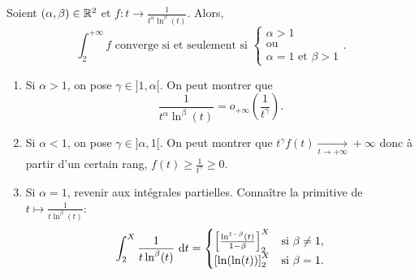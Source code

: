 \begin{tcolorbox}
    Soient $(\alpha, \beta) \in  \mathbb{R}^2$ et $f:t \to \frac{1}{t^{\alpha} \ln^{\beta} (t)}$. Alors,
    $$\int_{2}^{+ \infty} f \text{ converge si et seulement si }
    \begin{cases}
    \alpha > 1 \\
    \text{ou}\\
    \alpha = 1 \text{ et } \beta > 1
    \end{cases}.
    $$
\end{tcolorbox}

\begin{preuve}
    \begin{enumerate}
        \item Si $\alpha > 1$, on pose $\gamma \in ]1, \alpha[$. On peut montrer que $$\displaystyle \frac{1}{t^{\alpha} \ln^{\beta} (t)} = o_{+ \infty} \left( \frac{1}{t^{\gamma}} \right).$$
        \item Si $\alpha < 1$, on pose $\gamma \in ]\alpha, 1[$. On peut montrer que 
        $ t^{\gamma} f(t) \xrightarrow[t \to + \infty]{} + \infty $
        donc à partir d'un certain rang, $f(t) \geqslant \frac{1}{t^{\gamma}} \geqslant 0$.
        \item Si $\alpha = 1$, revenir aux intégrales partielles. Connaître la primitive de $t \mapsto \frac{1}{t \ln^{\beta} (t)}$:
        $$\int_{2}^{X} \frac{1}{t \ln^{\beta} (t)}\ \d t = 
        \begin{cases}
            \left[ \frac{\ln ^{1-\beta} (t)}{1-\beta} \right]_2 ^X & \text{si } \beta \not = 1, \\
            \left[\ln (\ln(t)) \right]_2 ^X & \text{si } \beta = 1.
        \end{cases}
        $$
    \end{enumerate}
\end{preuve}
